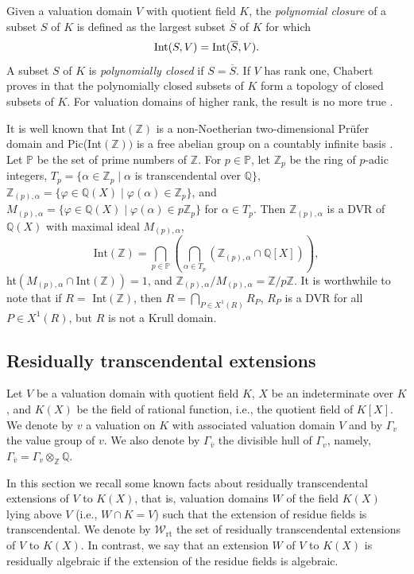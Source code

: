 \documentclass[10pt]{article}
\numberwithin{equation}{section}
\theoremstyle{definition}
\theoremstyle{definition}
\newcommand{\Q}{\mathbb{Q}}
\newcommand{\Z}{\mathbb{Z}}
\newcommand{\PP}{\mathbb{P}}
\newcommand{\Int}{\textnormal{Int}}
\newcommand{\rt}{\text{rt}}
\newcommand{\ov}{\overline{v}}
\begin{document}
Given a valuation domain $V$ with quotient field $K$, the \emph{polynomial closure} of a subset $S$ of $K$ is defined as the largest subset $\overline{S}$ of $K$ for which
$$\Int(S,V)=\Int(\overline{S},V).$$
A subset $S$ of $K$ is \emph{polynomially closed} if $S=\overline{S}$. If $V$ has rank one, Chabert proves in \cite{ChabPolCloVal}  
that the polynomially closed subsets of $K$ form a topology of closed subsets of $K$. For valuation domains of higher rank, the result is no more true \cite{PSpolclo}.

It is well known that Int$(\Z)$ is a non-Noetherian two-dimensional Pr\"ufer domain \cite[Remarks VI.1.8]{cc97}
and Pic(Int$(\Z))$ is a free abelian group on a countably infinite basis \cite[Corollary 7]{ghls90}.
Let $\PP$ be the set of prime numbers of $\Z$. For $p \in \PP$, let $\Z_p$ be the ring of $p$-adic integers,
$T_p = \{\alpha \in \Z_p \mid \alpha$ is transcendental over $\Q\}$, $\Z_{(p), \alpha} = \{\varphi \in \Q(X) \mid \varphi(\alpha) \in \Z_p\}$,
and $M_{(p), \alpha} = \{\varphi \in \Q(X) \mid \varphi(\alpha) \in p\Z_p\}$ for $\alpha \in T_p$.
Then $\Z_{(p), \alpha}$ is a DVR of $\Q(X)$ with maximal ideal $M_{(p), \alpha}$, 
$$\text{Int}(\Z) = \bigcap_{p \in \PP}(\bigcap_{\alpha \in T_p}(\Z_{(p), \alpha} \cap \Q[X])),$$
ht$(M_{(p), \alpha} \cap \text{Int}(\Z)) = 1$, and $\Z_{(p), \alpha}/M_{(p), \alpha} = \Z/p\Z$.
It is worthwhile to note that if $R =$ Int$(\Z)$, then $R = \bigcap\limits_{P \in X^1(R)} R_P$, $R_P$ is a DVR for all $P \in X^1(R)$,
but $R$ is not a Krull domain.

\subsection{Residually transcendental extensions}\label{res transcendental}

Let $V$ be a valuation domain with quotient field $K$,
$X$ be an indeterminate over $K$, and $K(X)$ be the field of rational function, i.e.,
the quotient field of $K[X]$. We denote by $v$ a valuation on $K$ with associated valuation domain $V$ and by $\Gamma_v$ the value group of $v$.  
We also denote by $\Gamma_{\ov}$ the divisible hull of $\Gamma_v$, namely, $\Gamma_{\ov}=\Gamma_v\otimes_{\Z}\Q$.

In this section we recall some known facts about residually transcendental extensions of $V$ to $K(X)$, that is, valuation domains $W$ of the field $K(X)$ lying above $V$ (i.e., $W\cap K=V$) such that the extension of residue fields is transcendental.  We denote by $\mathcal W_{\rt}$  the set of residually transcendental extensions of $V$ to $K(X)$. In contrast, we say that an extension $W$ of $V$ to $K(X)$ is residually algebraic if the extension of the residue fields is algebraic.
\end{document}
